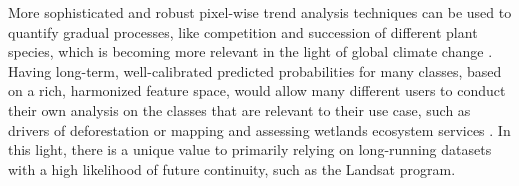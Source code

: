         More sophisticated and robust pixel-wise trend analysis techniques can be used to quantify gradual processes, like competition and succession of different plant species, which is becoming more relevant in the light of global climate change \citep{bonannella2023biomes}. Having long-term, well-calibrated predicted probabilities for many classes, based on a rich, harmonized feature space, would allow many different users to conduct their own analysis on the classes that are relevant to their use case, such as drivers of deforestation \citep{masolele2024mapping} or mapping and assessing wetlands ecosystem services \citep{fitoka2020water}. In this light, there is a unique value to primarily relying on long-running datasets with a high likelihood of future continuity, such as the Landsat program.
        
        \begin{figure}[H]
        \centering
        \begin{subfigure}[t]{0.06\textwidth}
        \centering

\end{subfigure}
\end{figure}
